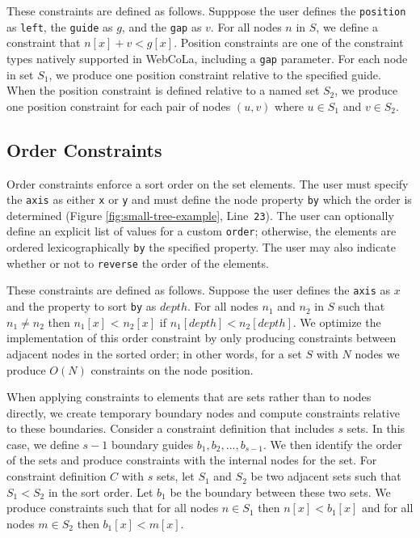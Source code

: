 These constraints are defined as follows.  Supppose the user defines the
\texttt{position} as \texttt{left},
the \texttt{guide} as $g$, and the \texttt{gap} as $v$. For all nodes $n$
in $S$, we define a constraint that $n[x] + v < g[x]$.
Position constraints are one of the constraint types natively supported in
WebCoLa, including a \texttt{gap} parameter. For each node
in set $S_1$, we produce one position constraint relative to the specified guide.
When the position constraint is defined relative to a named set $S_2$,
we produce one position constraint for each pair of nodes $(u, v)$ where $u \in S_1$ and $v \in S_2$.



\subsection{Order Constraints}
Order constraints enforce a sort order on the set elements. The user must 
specify the \texttt{axis} as either \texttt{x} or \texttt{y} and must define
the node property \texttt{by} which the order is determined 
(Figure \ref{fig:small-tree-example}, Line~\texttt{23}). 
The user can optionally define an explicit list of values for a custom
\texttt{order}; otherwise, the elements are ordered lexicographically \texttt{by}
the specified property. The user may also indicate whether
or not to \texttt{reverse} the order of the elements.

These constraints are defined as follows.  Suppose the user defines the \texttt{axis} as
$x$ and the property to sort \texttt{by} as $depth$. For all nodes $n_1$ 
and $n_2$ in $S$  such that $n_1 \neq n_2$ then $n_1[x]$ < $n_2[x]$
if $n_1[depth] < n_2[depth]$. We optimize the implementation of this order
constraint by only producing constraints between adjacent nodes in the sorted 
order; in other words, for a set $S$ with $N$ nodes we produce $O(N)$ 
constraints on the node position.

When applying constraints to elements that are sets rather than to nodes
directly, we create temporary boundary nodes and compute constraints relative to
these boundaries. Consider a constraint definition that includes $s$ sets. 
In this case, we define $s-1$ boundary guides $b_1, b_2, ..., b_{s-1}$. We then
identify the order of the sets and produce constraints with the internal
nodes for the set. For constraint definition $C$ with $s$ sets, let $S_1$ and
$S_2$ be two adjacent sets such that $S_1 < S_2$ in the sort order. Let $b_1$ be
the boundary between these two sets. We produce constraints such that for all
nodes $n \in S_1$ then $n[x] < b_1[x]$ and for all nodes $m \in S_2$ then $b_1[x] < m[x]$.

